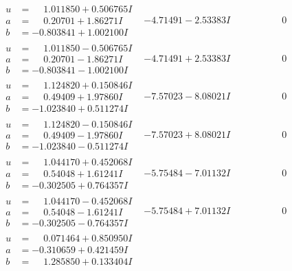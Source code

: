 \documentclass[1p]{elsarticle_modified}
\theoremstyle{definition}
\begin{document}
$$\begin{array}{c|c|c}
\begin{aligned}
u &= \phantom{-}1.011850 + 0.506765 I \\
a &= \phantom{-}0.20701 + 1.86271 I \\
b &= -0.803841 + 1.002100 I\end{aligned}
 & -4.71491 - 2.53383 I & \phantom{-0.000000 } 0 \\ \hline\begin{aligned}
u &= \phantom{-}1.011850 - 0.506765 I \\
a &= \phantom{-}0.20701 - 1.86271 I \\
b &= -0.803841 - 1.002100 I\end{aligned}
 & -4.71491 + 2.53383 I & \phantom{-0.000000 } 0 \\ \hline\begin{aligned}
u &= \phantom{-}1.124820 + 0.150846 I \\
a &= \phantom{-}0.49409 + 1.97860 I \\
b &= -1.023840 + 0.511274 I\end{aligned}
 & -7.57023 - 8.08021 I & \phantom{-0.000000 } 0 \\ \hline\begin{aligned}
u &= \phantom{-}1.124820 - 0.150846 I \\
a &= \phantom{-}0.49409 - 1.97860 I \\
b &= -1.023840 - 0.511274 I\end{aligned}
 & -7.57023 + 8.08021 I & \phantom{-0.000000 } 0 \\ \hline\begin{aligned}
u &= \phantom{-}1.044170 + 0.452068 I \\
a &= \phantom{-}0.54048 + 1.61241 I \\
b &= -0.302505 + 0.764357 I\end{aligned}
 & -5.75484 - 7.01132 I & \phantom{-0.000000 } 0 \\ \hline\begin{aligned}
u &= \phantom{-}1.044170 - 0.452068 I \\
a &= \phantom{-}0.54048 - 1.61241 I \\
b &= -0.302505 - 0.764357 I\end{aligned}
 & -5.75484 + 7.01132 I & \phantom{-0.000000 } 0 \\ \hline\begin{aligned}
u &= \phantom{-}0.071464 + 0.850950 I \\
a &= -0.310659 + 0.421459 I \\
b &= \phantom{-}1.285850 + 0.133404 I\end{aligned}

\end{array}$$
\end{document}
